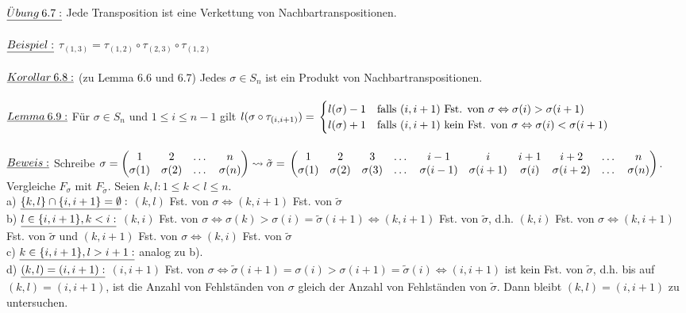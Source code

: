 \documentclass[fleqn, a4paper, 11pt]{scrartcl}
\theoremstyle{definition}
\begin{document}
\\
$\uline{\ddot{U}bung\:6.7:}$ Jede Transposition ist eine Verkettung von Nachbartranspositionen.\\
\\
$\uline{Beispiel:}$ $\tau_{(1,3)}=\tau_{(1,2)}\circ\tau_{(2,3)}\circ\tau_{(1,2)}$\\
\\
$\uline{Korollar\:6.8:}$ (zu Lemma 6.6 und 6.7) Jedes $\sigma\in S_n$ ist ein Produkt von Nachbartranspositionen.\\
\\
$\uline{Lemma\:6.9:}$ Für $\sigma\in S_n$ und $1\leq i\leq n-1$ gilt $l(\sigma\circ\tau_{(i,i+1)})=\\
\begin{cases}
	l(\sigma )-1 & \text{falls }(i,i+1)\text{ Fst. von }\sigma\Leftrightarrow\sigma (i)>\sigma (i+1)\\
	l(\sigma )+1 & \text{falls }(i,i+1)\text{ kein Fst. von }\sigma\Leftrightarrow\sigma (i)<\sigma (i+1)
\end{cases}$\\
\\
$\uline{Beweis:}$ Schreibe $\sigma=\begin{pmatrix}
	1 & 2 & \dots & n\\
	\sigma(1) & \sigma(2) & \dots & \sigma(n)
\end{pmatrix}\leadsto \tilde{\sigma}=\\
\begin{pmatrix}
	1 & 2 & 3 & \dots & i-1 & i & i+1 & i+2 & \dots & n\\
	\sigma(1) & \sigma(2) & \sigma(3) & \dots & \sigma(i-1) & \sigma(i+1) & \sigma(i) & \sigma(i+2) & \dots & \sigma(n)
\end{pmatrix}$. Vergleiche $F_\sigma$ mit $F_{\tilde{\sigma}}$. Seien $k,l:1\leq k<l\leq n$.\\
a) $\uline{\{k,l\}\cap\{i,i+1\}=\emptyset}:$ $(k,l)$ Fst. von $\sigma\Leftrightarrow (k,i+1)$ Fst. von $\tilde{\sigma}$\\
b) $\uline{l\in\{i,i+1\},k<i:}$ $(k,i)$ Fst. von $\sigma\Leftrightarrow\sigma(k)>\sigma(i)=\tilde{\sigma}(i+1)\Leftrightarrow(k,i+1)$ Fst. von $\tilde{\sigma}$, d.h. $(k,i)$ Fst. von $\sigma\Leftrightarrow(k,i+1)$\\
 Fst. von $\tilde{\sigma}$ und $(k,i+1)$ Fst. von $\sigma\Leftrightarrow(k,i)$ Fst. von $\tilde{\sigma}$\\
c) $\uline{k\in\{i,i+1\},l>i+1:}$ analog zu b).\\
d) $\uline{(k,l)=(i,i+1):}$ $(i,i+1)$ Fst. von $\sigma\Leftrightarrow\tilde{\sigma}(i+1)=\sigma(i)>\sigma(i+1)=\tilde{\sigma}(i)\Leftrightarrow (i,i+1)$ ist kein Fst. von $\tilde{\sigma}$, d.h. bis auf $(k,l)=(i,i+1)$, ist die Anzahl von Fehlständen von $\sigma$ gleich der Anzahl von Fehlständen von $\tilde{\sigma}$. Dann bleibt $(k,l)=(i,i+1)$ zu untersuchen.\\
\end{document}
